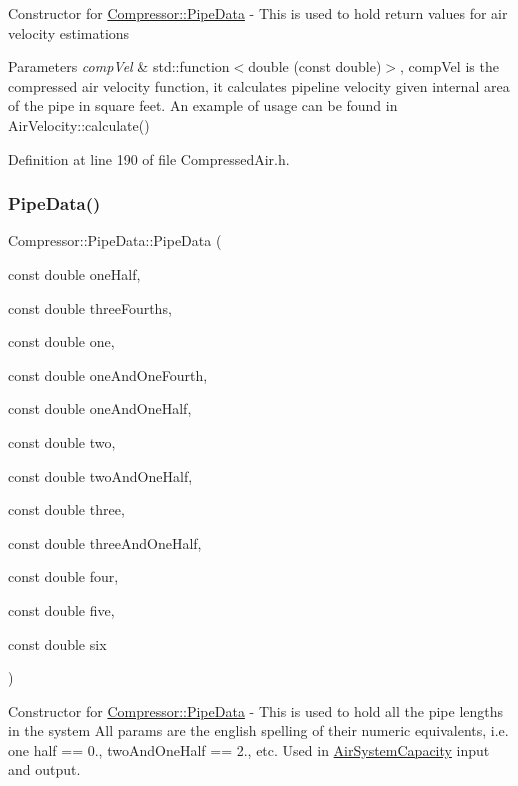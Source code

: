 Constructor for \hyperlink{struct_compressor_1_1_pipe_data}{Compressor\+::\+Pipe\+Data} -\/ This is used to hold return values for air velocity estimations 
\begin{DoxyParams}{Parameters}
{\em comp\+Vel} & std\+::function$<$double (const double)$>$, comp\+Vel is the compressed air velocity function, it calculates pipeline velocity given internal area of the pipe in square feet. An example of usage can be found in Air\+Velocity\+::calculate() \\
\hline
\end{DoxyParams}


Definition at line 190 of file Compressed\+Air.\+h.

\mbox{\label{struct_compressor_1_1_pipe_data_a71acdc81e25bd90b51361bf8d4f0ed38}} 
\subsubsection{\texorpdfstring{Pipe\+Data()}{PipeData()}\hspace{0.1cm}{\footnotesize\ttfamily [5/6]}}
{\footnotesize\ttfamily Compressor\+::\+Pipe\+Data\+::\+Pipe\+Data (\begin{DoxyParamCaption}\item[{const double}]{one\+Half,  }\item[{const double}]{three\+Fourths,  }\item[{const double}]{one,  }\item[{const double}]{one\+And\+One\+Fourth,  }\item[{const double}]{one\+And\+One\+Half,  }\item[{const double}]{two,  }\item[{const double}]{two\+And\+One\+Half,  }\item[{const double}]{three,  }\item[{const double}]{three\+And\+One\+Half,  }\item[{const double}]{four,  }\item[{const double}]{five,  }\item[{const double}]{six }\end{DoxyParamCaption})\hspace{0.3cm}{\ttfamily [inline]}}

Constructor for \hyperlink{struct_compressor_1_1_pipe_data}{Compressor\+::\+Pipe\+Data} -\/ This is used to hold all the pipe lengths in the system All params are the english spelling of their numeric equivalents, i.\+e. one half == 0., two\+And\+One\+Half == 2., etc. Used in \hyperlink{class_compressor_1_1_air_system_capacity}{Air\+System\+Capacity} input and output. 

